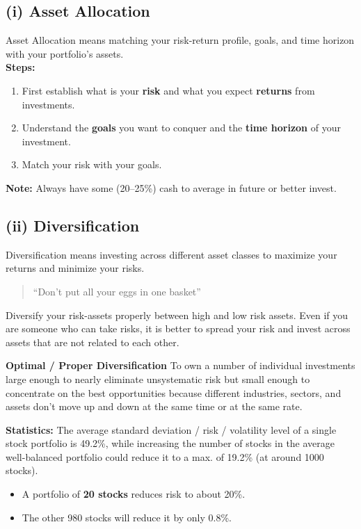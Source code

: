 \documentclass[12pt]{article}
\begin{document}
\subsection*{(i) Asset Allocation}
Asset Allocation means matching your risk-return profile, goals, and time horizon with your portfolio's assets.\\

\textbf{Steps:}
\begin{enumerate}
    \item First establish what is your \textbf{risk} and what you expect \textbf{returns} from investments.
    \item Understand the \textbf{goals} you want to conquer and the \textbf{time horizon} of your investment.
    \item Match your risk with your goals.
\end{enumerate}

\noindent\textbf{Note:} Always have some (20--25\%) cash to average in future or better invest.

\subsection*{(ii) Diversification}
Diversification means investing across different asset classes to maximize your returns and minimize your risks.

\begin{quote}
    ``Don't put all your eggs in one basket''
\end{quote}

Diversify your risk-assets properly between high and low risk assets. Even if you are someone who can take risks, it is better to spread your risk and invest across assets that are not related to each other.

\textbf{Optimal / Proper Diversification}
To own a number of individual investments large enough to nearly eliminate unsystematic risk but small enough to concentrate on the best opportunities because different industries, sectors, and assets don't move up and down at the same time or at the same rate.

\textbf{Statistics:}
The average standard deviation / risk / volatility level of a single stock portfolio is 49.2\%, while increasing the number of stocks in the average well-balanced portfolio could reduce it to a max. of 19.2\% (at around 1000 stocks).

\begin{itemize}
    \item A portfolio of \textbf{20 stocks} reduces risk to about 20\%.
    \item The other 980 stocks will reduce it by only 0.8\%.
\end{itemize}
\end{document}
